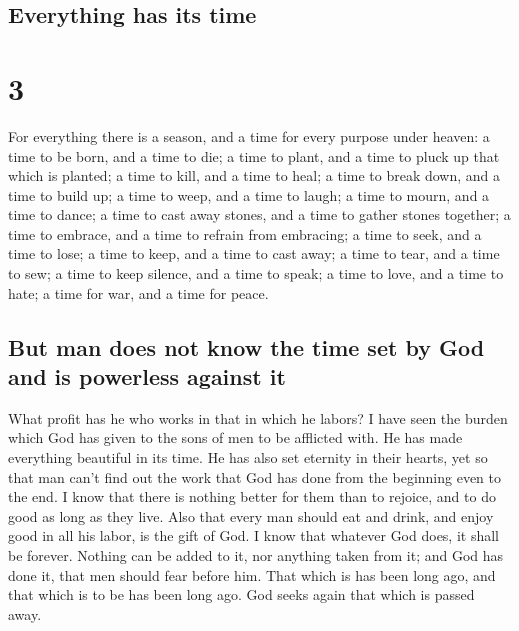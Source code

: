 \hypertarget{everything-has-its-time}{%
\subsection{Everything has its time}\label{everything-has-its-time}}

\hypertarget{section-2}{%
\section{3}\label{section-2}}

 For everything there is a season, and a time for every
purpose under heaven:  a time to be born, and a time to
die; a time to plant, and a time to pluck up that which is planted;
 a time to kill, and a time to heal; a time to break down,
and a time to build up;  a time to weep, and a time to
laugh; a time to mourn, and a time to dance;  a time to
cast away stones, and a time to gather stones together; a time to
embrace, and a time to refrain from embracing;  a time to
seek, and a time to lose; a time to keep, and a time to cast away;
 a time to tear, and a time to sew; a time to keep
silence, and a time to speak;  a time to love, and a time
to hate; a time for war, and a time for peace.

\hypertarget{but-man-does-not-know-the-time-set-by-god-and-is-powerless-against-it}{%
\subsection{But man does not know the time set by God and is powerless
against
it}\label{but-man-does-not-know-the-time-set-by-god-and-is-powerless-against-it}}

 What profit has he who works in that in which he labors?
 I have seen the burden which God has given to the sons
of men to be afflicted with.  He has made everything
beautiful in its time. He has also set eternity in their hearts, yet so
that man can't find out the work that God has done from the beginning
even to the end.  I know that there is nothing better for
them than to rejoice, and to do good as long as they live.
 Also that every man should eat and drink, and enjoy good
in all his labor, is the gift of God.  I know that
whatever God does, it shall be forever. Nothing can be added to it, nor
anything taken from it; and God has done it, that men should fear before
him.  That which is has been long ago, and that which is
to be has been long ago. God seeks again that which is passed away.

